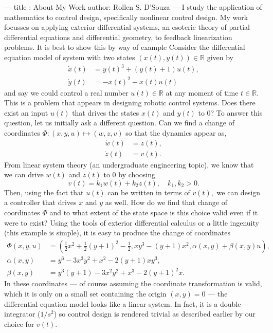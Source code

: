 ---
title : About My Work
author: Rollen S. D'Souza
---
I study the application of mathematics to control design, specifically nonlinear control design.
My work focusses on applying exterior differential systems, an esoteric theory of partial differential equations and differential geometry, to feedback linearization problems.
It is best to show this by way of example
Consider the differential equation model of system with two states \((x(t), y(t))\in\mathbb{R}\) given by
\[
\begin{aligned}
  \dot{x}(t) &= y(t)^3 + (y(t) + 1) u(t),\\
  \dot{y}(t) &= -x(t)^2 - x(t) u(t)
\end{aligned}
\]
and say we could control a real number \(u(t)\in\mathbb{R}\) at any moment of time \(t \in \mathbb{R}.\)
This is a problem that appears in designing robotic control systems.
Does there exist an input \(u(t)\) that drives the states \(x(t)\) and \(y(t)\) to \(0\)?
To answer this question, let us initially ask a different question.
Can we find a change of coordinates \(\Phi: (x,y,u) \mapsto (w,z,v)\) so that the dynamics appear as,
\[
\begin{aligned}
  \dot{w}(t) &= z(t),\\
  \dot{z}(t) &= v(t).
\end{aligned}
\]
From linear system theory (an undergraduate engineering topic), we know that we can drive \(w(t)\) and \(z(t)\) to \(0\) by choosing
\[
  v(t) = k_1 w(t) + k_2 z(t),\quad k_1, k_2 > 0.
\]
Then, using the fact that \(u(t)\) can be written in terms of \(v(t),\) we can design a controller that drives \(x\) and \(y\) as well.
How do we find that change of coordinates \(\Phi\) and to what extent of the state space is this choice valid even if it were to exist?
Using the tools of exterior differential calculus or a little ingenuity (this example is simple), it is easy to produce the change of coordinates
\[
\begin{aligned}
  \Phi(x,y,u) &=
    \left(
      \frac{1}{2}x^2 + \frac{1}{2}(y+1)^2 - \frac{1}{2},
      x y^3 - (y + 1) x^2,
      \alpha(x,y) + \beta(x,y) u
    \right),\\
  \alpha(x,y) &= 
    y^6
    - 3 x^3 y^2
    + x^2
    - 2 (y + 1) x y^3,\\
  \beta(x,y) &=
    y^3 (y + 1)
    - 3 x^2 y^2
    + x^3
    - 2 (y + 1)^2 x.
\end{aligned}
\]
In these coordinates --- of course assuming the coordinate transformation is valid, which it is only on a small set containing the origin \((x,y) = 0\) --- the differential equation model looks like a linear system.
In fact, it is a double integrator (\(1/s^2\)) so control design is rendered trivial as described earlier by our choice for \(v(t)\).

